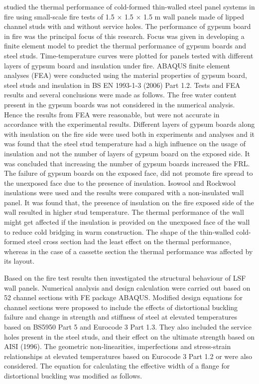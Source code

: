 \citet{Feng2003c} studied the thermal performance of cold-formed thin-walled steel panel systems in fire using small-scale fire tests of 1.5 $\times$ 1.5 $\times$ 1.5 m wall panels made of lipped channel studs with and without service holes. The performance of gypsum board in fire was the principal focus of this research. Focus was given in developing a finite element model to predict the thermal performance of gypsum boards and steel studs. Time-temperature curves were plotted for panels tested with different layers of gypsum board and insulation under fire. ABAQUS finite element analyses (FEA) were conducted using the material properties of gypsum board, steel studs and insulation in BS EN 1993-1-3 (2006) Part 1.2. Tests and FEA results and several conclusions were made as follows. The free water content present in the gypsum boards was not considered in the numerical analysis. Hence the results from FEA were reasonable, but were not accurate in accordance with the experimental results. Different layers of gypsum boards along with insulation on the fire side were used both in experiments and analyses and it was found that the steel stud temperature had a high influence on the usage of insulation and not the number of layers of gypsum board on the exposed side. It was concluded that increasing the number of gypsum boards increased the FRL. The failure of gypsum boards on the exposed face, did not promote fire spread to the unexposed face due to the presence of insulation. Isowool and Rockwool insulations were used and the results were compared with a non-insulated wall panel. It was found that, the presence of insulation on the fire exposed side of the wall resulted in higher stud temperature. The thermal performance of the wall might get affected if the insulation is provided on the unexposed face of the wall to reduce cold bridging in warm construction. The shape of the thin-walled cold-formed steel cross section had the least effect on the thermal performance, whereas in the case of a cassette section the thermal performance was affected by its layout.  

Based on the fire test results \citet{Feng2003d} then investigated the structural behaviour of LSF wall panels. Numerical analysis and design calculation were carried out based on 52 channel sections with FE package ABAQUS. Modified design equations for channel sections were proposed to include the effects of distortional buckling failure and change in strength and stiffness of steel at elevated temperatures based on BS5950 Part 5 and Eurocode 3 Part 1.3. They also included the service holes present in the steel studs, and their effect on the ultimate strength based on AISI (1996). The geometric non-linearities, imperfections and stress-strain relationships at elevated temperatures based on Eurocode 3 Part 1.2 or \citet{Outinen1997} were also considered. The equation for calculating the effective width of a flange for distortional buckling was modified as follows.

